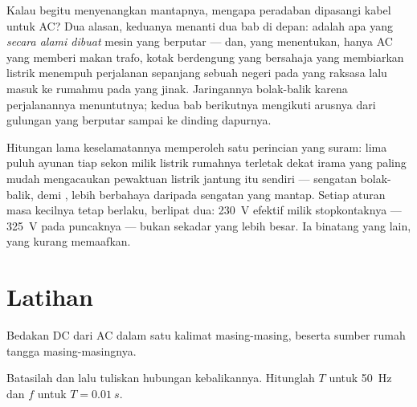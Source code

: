 \begin{remark}\label{rem:g9:alternating-current:why}
Kalau  begitu menyenangkan mantapnya, mengapa peradaban dipasangi
kabel untuk AC? Dua alasan, keduanya menanti dua bab di depan:  adalah apa yang \emph{secara alami dibuat} mesin yang
berputar --- dan, yang menentukan, hanya AC yang memberi makan trafo,
kotak berdengung yang bersahaja yang membiarkan listrik menempuh
perjalanan sepanjang sebuah negeri pada  yang raksasa lalu
masuk ke rumahmu pada  yang jinak. Jaringannya bolak-balik
karena perjalanannya menuntutnya; kedua bab berikutnya mengikuti
arusnya dari gulungan yang berputar sampai ke dinding dapurnya.
\end{remark}

\begin{remark}\label{rem:g9:alternating-current:safety}
Hitungan lama keselamatannya memperoleh satu perincian yang suram: lima
puluh ayunan tiap sekon milik listrik rumahnya terletak dekat irama
yang paling mudah mengacaukan pewaktuan listrik jantung itu sendiri ---
sengatan bolak-balik,  demi , lebih berbahaya daripada
sengatan yang mantap. Setiap aturan masa kecilnya tetap berlaku,
berlipat dua: \qty{230}{V} efektif milik stopkontaknya ---
\qty{325}{V} pada puncaknya --- bukan sekadar  yang lebih besar.
Ia binatang yang lain, yang kurang memaafkan.
\end{remark}

\section{Latihan}

\begin{exercise}[$\star$]\label{exo:g9:alternating-current:1}
Bedakan DC dari AC dalam satu kalimat masing-masing, beserta sumber
rumah tangga masing-masingnya.
\end{exercise}

\begin{exercise}[$\star$]\label{exo:g9:alternating-current:2}
Batasilah  dan  lalu tuliskan hubungan kebalikannya.
Hitunglah $T$ untuk \qty{50}{Hz} dan $f$ untuk
$T = \qty{0.01}{s}$.
\end{exercise}

